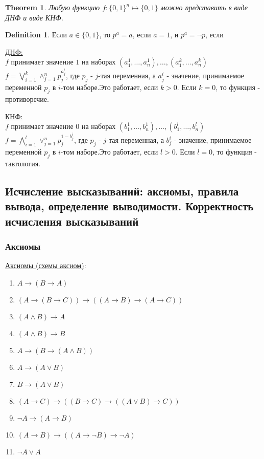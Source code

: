 \documentclass[a4paper]{article}
\theoremstyle{plain}
\newtheorem{theorem}{Theorem}
\theoremstyle{remark}
\theoremstyle{definition}
\newtheorem{definition}{Definition}
\begin{document}
\begin{theorem}
	Любую функцию $f: \{0,1\}^n \mapsto \{0,1\}$ можно представить в виде ДНФ и виде КНФ.
\end{theorem}

\begin{definition} %
	Если $a \in \{0,1\}$, то $p^a = a$, если $a = 1$, и $p^a = \lnot p$, если 
\end{definition}

\underline{ДНФ:} \\
	$f$ принимает значение $1$ на наборах $(a_1^1, \ldots, a_n^1), \ldots, (a_1^k, \ldots, a_n^k)$\\
	$f = \bigvee_{i=1}^k \land_{j=1}^{n} p_j^{a_j^i}$, где $p_j$ - $j$-тая переменная, а $a_j^i$ - значение, принимаемое переменной $p_j$ в $i$-том наборе.Это работает, если $k > 0$. Если $k = 0$, то функция - противоречие.

\underline{КНФ:} \\
	$f$ принимает значение $0$ на наборах $(b_1^1, \ldots, b_n^1), \ldots, (b_1^l, \ldots, b_n^l)$\\
	$f = \bigwedge_{i=1}^l \lor_{j=1}^{n} p_j^{1 - b_j^i}$, где $p_j$ - $j$-тая переменная, а $b_j^i$ - значение, принимаемое переменной $p_j$ в $i$-том наборе.Это работает, если $l > 0$. Если $l = 0$, то функция - тавтология.
\subsection{Исчисление высказываний: аксиомы, правила вывода, определение выводимости. Корректность исчисления высказываний}
\subsubsection{Аксиомы}
\underline{Аксиомы (схемы аксиом)}:
\begin{enumerate}
	\item $A \rightarrow (B \rightarrow A)$
	\item $(A \rightarrow (B \rightarrow C)) \rightarrow ((A \rightarrow B)\rightarrow(A\rightarrow C))$
	\item $(A \land B)\rightarrow A$
	\item $(A \land B)\rightarrow B$
	\item $A \rightarrow (B \rightarrow (A \land B))$
	\item $A \rightarrow (A \lor B)$
	\item $B \rightarrow (A \lor B)$
	\item $(A \rightarrow C) \rightarrow ((B \rightarrow C) \rightarrow ((A \lor B) \rightarrow C))$
	\item $\lnot A \rightarrow (A \rightarrow B)$
	\item $(A \rightarrow B) \rightarrow (( A \rightarrow \lnot B) \rightarrow \lnot A)$
	\item $\lnot A \lor A$
\end{enumerate}
\end{document}
